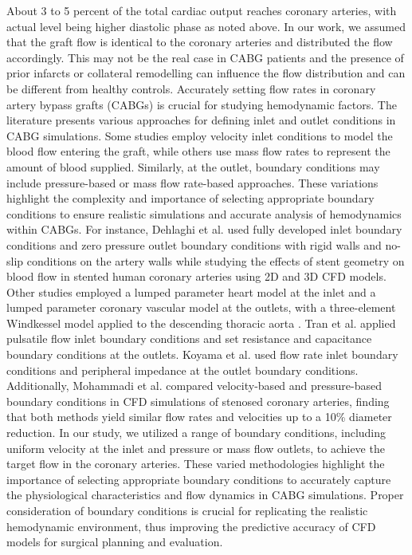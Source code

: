 ﻿\documentclass[12pt,a4paper]{article}
\theoremstyle{definition}
\numberwithin{equation}{section}
\begin{document}
About 3 to 5 percent of the total cardiac output reaches coronary arteries, with actual level being higher diastolic phase as noted above. In our work, we assumed that the graft flow is identical to the coronary arteries and distributed the flow accordingly. This may not be the real case in CABG patients and the presence of prior infarcts or collateral remodelling can influence the flow distribution and can be different from healthy controls. Accurately setting flow rates in coronary artery bypass grafts (CABGs) is crucial for studying hemodynamic factors. The literature presents various approaches for defining inlet and outlet conditions in CABG simulations. Some studies employ velocity inlet conditions to model the blood flow entering the graft, while others use mass flow rates to represent the amount of blood supplied. Similarly, at the outlet, boundary conditions may include pressure-based or mass flow rate-based approaches. These variations highlight the complexity and importance of selecting appropriate boundary conditions to ensure realistic simulations and accurate analysis of hemodynamics within CABGs. For instance, Dehlaghi et al. \cite{12} used fully developed inlet boundary conditions and zero pressure outlet boundary conditions with rigid walls and no-slip conditions on the artery walls while studying the effects of stent geometry on blood flow in stented human coronary arteries using 2D and 3D CFD models. Other studies employed a lumped parameter heart model at the inlet and a lumped parameter coronary vascular model at the outlets, with a three-element Windkessel model applied to the descending thoracic aorta \cite{13, 14, 18}. Tran et al. \cite{15, 17} applied pulsatile flow inlet boundary conditions and set resistance and capacitance boundary conditions at the outlets. Koyama et al. \cite{16} used flow rate inlet boundary conditions and peripheral impedance at the outlet boundary conditions. Additionally, Mohammadi et al. \cite{19} compared velocity-based and pressure-based boundary conditions in CFD simulations of stenosed coronary arteries, finding that both methods yield similar flow rates and velocities up to a 10\% diameter reduction. In our study, we utilized a range of boundary conditions, including uniform velocity at the inlet and pressure or mass flow outlets, to achieve the target flow in the coronary arteries. These varied methodologies highlight the importance of selecting appropriate boundary conditions to accurately capture the physiological characteristics and flow dynamics in CABG simulations. Proper consideration of boundary conditions is crucial for replicating the realistic hemodynamic environment, thus improving the predictive accuracy of CFD models for surgical planning and evaluation. 
\end{document}
